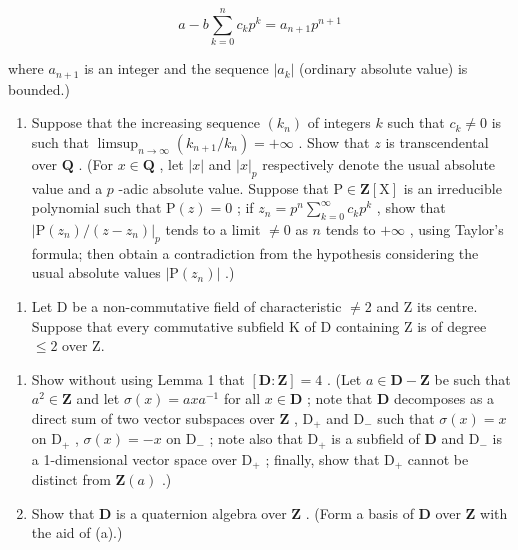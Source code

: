 \[
a - b \sum_ {k = 0} ^ {n} c _ {k} p ^ {k} = a _ {n + 1} p ^ {n + 1}
\]

where \(a_{n+1}\) is an integer and the sequence \(|a_k|\) (ordinary absolute value) is bounded.)

\begin{enumerate}
\def\labelenumi{(\alph{enumi})}
\setcounter{enumi}{1}
\tightlist
\item
  Suppose that the increasing sequence \((k_n)\) of integers \(k\) such that \(c_k \neq 0\) is such that \(\limsup_{n \to \infty} (k_{n+1}/k_n) = +\infty\) . Show that \(z\) is transcendental over \(\mathbf{Q}\) . (For \(x \in \mathbf{Q}\) , let \(|x|\) and \(|x|_p\) respectively denote the usual absolute value and a \(p\) -adic absolute value. Suppose that \(\mathrm{P} \in \mathbf{Z}[\mathrm{X}]\) is an irreducible polynomial such that \(\mathrm{P}(z) = 0\) ; if \(z_n = p^n \sum_{k=0}^{\infty} c_k p^k\) , show that \(|\mathrm{P}(z_n)/(z - z_n)|_p\) tends to a limit \(\neq 0\) as \(n\) tends to \(+\infty\) , using Taylor's formula; then obtain a contradiction from the hypothesis considering the usual absolute values \(|\mathrm{P}(z_n)|\) .)
\end{enumerate}

\begin{enumerate}
\def\labelenumi{\arabic{enumi}.}
\setcounter{enumi}{1}
\tightlist
\item
  Let D be a non-commutative field of characteristic \(\neq2\) and Z its centre. Suppose that every commutative subfield K of D containing Z is of degree \(\leqslant2\) over Z.
\end{enumerate}

\begin{enumerate}
\def\labelenumi{(\alph{enumi})}
\item
  Show without using Lemma 1 that \([\mathbf{D}:\mathbf{Z}] = 4\) . (Let \(a\in \mathbf{D} - \mathbf{Z}\) be such that \(a^2\in \mathbf{Z}\) and let \(\sigma (x) = axa^{-1}\) for all \(x\in \mathbf{D}\) ; note that \(\mathbf{D}\) decomposes as a direct sum of two vector subspaces over \(\mathbf{Z}\) , \(\mathrm{D}_{+}\) and \(\mathrm{D}_{-}\) such that \(\sigma (x) = x\) on \(\mathrm{D}_{+}\) , \(\sigma (x) = -x\) on \(\mathrm{D}_{-}\) ; note also that \(\mathrm{D}_{+}\) is a subfield of \(\mathbf{D}\) and \(\mathrm{D}_{-}\) is a 1-dimensional vector space over \(\mathrm{D}_{+}\) ; finally, show that \(\mathrm{D}_{+}\) cannot be distinct from \(\mathbf{Z}(a)\) .)
\item
  Show that \(\mathbf{D}\) is a quaternion algebra over \(\mathbf{Z}\) . (Form a basis of \(\mathbf{D}\) over \(\mathbf{Z}\) with the aid of (a).)
\end{enumerate}

